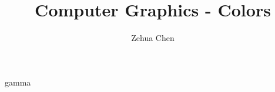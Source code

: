 \documentclass[letterpaper, 11pt]{report}
\title{Computer Graphics - Colors}
\author{Zehua Chen}
\begin{document}
  \maketitle
  \tableofcontents

  \setmainstyles

  {gamma}
\end{document}
